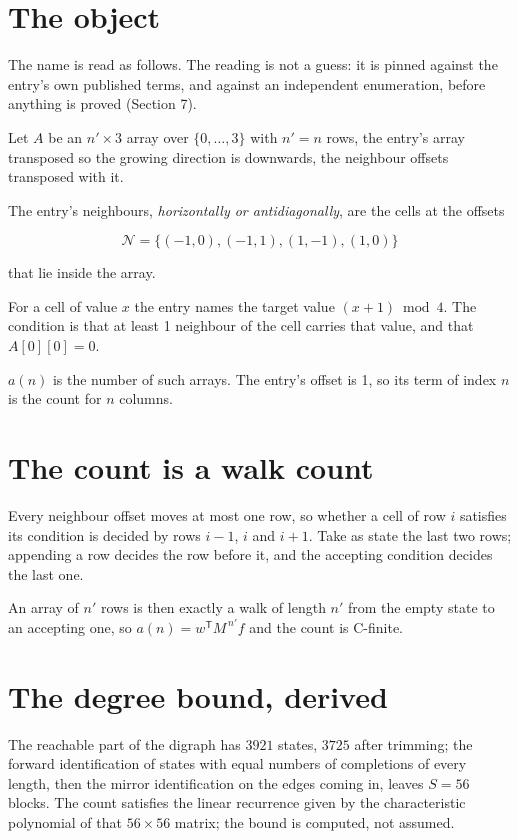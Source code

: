 \documentclass[11pt]{article}
\theoremstyle{definition}
\begin{document}
\section{The object}

The name is read as follows. The reading is not a guess: it is pinned against the entry's own published terms, and against an independent enumeration, before anything is proved (Section 7).

Let $A$ be an $n' \times 3$ array over $\{0,\dots,3\}$ with $n' = n$ rows, the entry's array transposed so the growing direction is downwards, the neighbour offsets transposed with it.

The entry's neighbours, {\itshape horizontally or antidiagonally}, are the cells at the offsets

\[\mathcal{N} = \{(-1,0), (-1,1), (1,-1), (1,0)\}\]

that lie inside the array.

For a cell of value $x$ the entry names the target value $(x + 1) \bmod 4$. The condition is that at least 1 neighbour of the cell carries that value, and that $A[0][0] = 0$.

$a(n)$ is the number of such arrays. The entry's offset is 1, so its term of index $n$ is the count for $n$ columns.

\section{The count is a walk count}

Every neighbour offset moves at most one row, so whether a cell of row $i$ satisfies its condition is decided by rows $i-1$, $i$ and $i+1$. Take as state the last two rows; appending a row decides the row before it, and the accepting condition decides the last one.

An array of $n'$ rows is then exactly a walk of length $n'$ from the empty state to an accepting one, so $a(n) = w^{\mathsf T}M^{\,n'}f$ and the count is C-finite.

\section{The degree bound, derived}

The reachable part of the digraph has $3921$ states, $3725$ after trimming; the forward identification of states with equal numbers of completions of every length, then the mirror identification on the edges coming in, leaves $S = 56$ blocks. The count satisfies the linear recurrence given by the characteristic polynomial of that $56\times56$ matrix; the bound is computed, not assumed.
\end{document}
